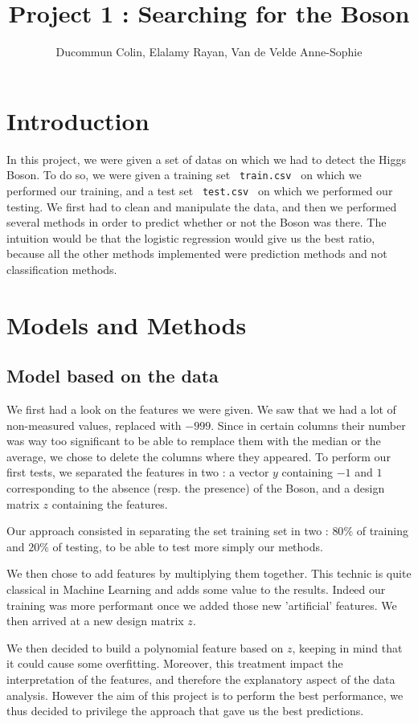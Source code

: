\documentclass[10pt, oneside]{article}   	%
\title{Project 1 : Searching for the Boson}
\author{Ducommun Colin, Elalamy Rayan, Van de Velde Anne-Sophie}
\begin{document}
\maketitle
\section{Introduction}
In this project, we were given a set of datas on which we had to detect the Higgs Boson. To do so, we were given a training set \lstinline! train.csv ! on which we performed our training, and a test set \lstinline" test.csv " on which we performed our testing. We first had to clean and manipulate the data, and then we performed several methods in order to predict whether or not the Boson was there. The intuition would be that the logistic regression would give us the best ratio, because all the other methods implemented were prediction methods and not classification methods.

\section{Models and Methods}

\subsection{Model based on the data}
We first had a look on the features we were given. We saw that we had a lot of non-measured values, replaced with $-999$. Since in certain columns their number was way too significant to be able to remplace them with the median or the average, we chose to delete the columns where they appeared. To perform our first tests, we separated the features in two : a vector $y$ containing $-1$ and $1$ corresponding to the absence (resp. the presence) of the Boson, and a design matrix $z$ containing the features.

Our approach consisted in separating the set training set in two : $80\%$ of training and $20\%$ of testing, to be able to test more simply our methods. 

We then chose to add features by multiplying them together. This technic is quite classical in Machine Learning and adds some value to the results. Indeed our training was more performant once we added those new 'artificial' features. We then arrived at a new design matrix $z$.

We then decided to build a polynomial feature based on $z$, keeping in mind that it could cause some overfitting. Moreover, this treatment impact the interpretation of the features, and therefore the explanatory aspect of the data analysis. However the aim of this project is to perform the best performance, we thus decided to privilege the approach that gave us the best predictions.
\end{document}
